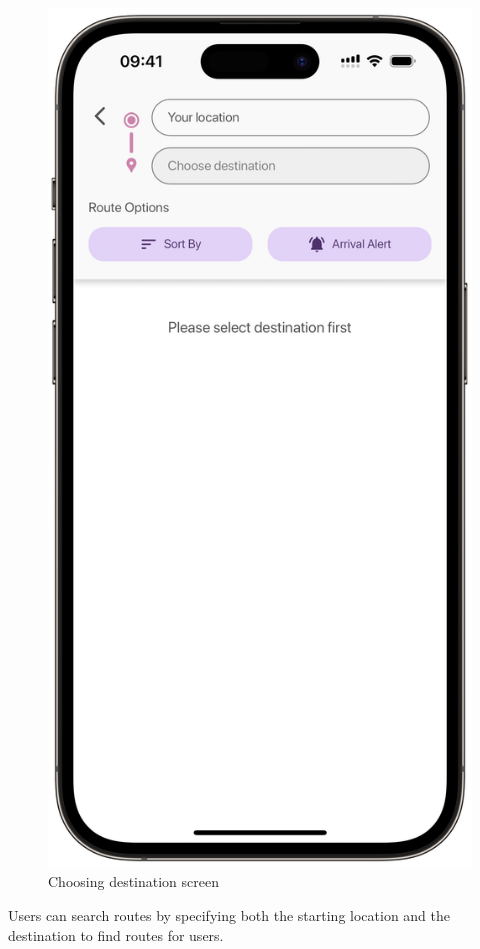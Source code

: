 \newpage
\begin{figure}[!h]
	\centering
	\includegraphics[width=0.5\linewidth]{chapter4/choosing_destination_screen.png}
	\caption{Choosing destination screen}
	\label{fig:Choosing destination screen}
\end{figure}
Users can search routes by specifying both the starting location and the destination to find routes for users.

